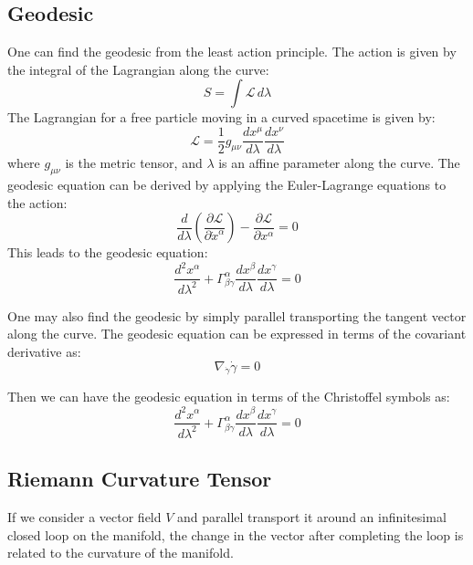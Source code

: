 \documentclass{article}
\begin{document}
\subsection{Geodesic}

One can find the geodesic from the least action principle. The action is given by the integral of the Lagrangian along the curve:
\begin{equation}
S = \int \mathcal{L} \, d\lambda
\end{equation}
The Lagrangian for a free particle moving in a curved spacetime is given by:
\begin{equation}
\mathcal{L} = \frac{1}{2} g_{\mu\nu} \frac{dx^\mu}{d\lambda} \frac{dx^\nu}{d\lambda}
\end{equation}
where $g_{\mu\nu}$ is the metric tensor, and $\lambda$ is an affine parameter along the curve. The geodesic equation can be derived by applying the Euler-Lagrange equations to the action:
\begin{equation}
\frac{d}{d\lambda} \left( \frac{\partial \mathcal{L}}{\partial \dot{x}^\alpha} \right) - \frac{\partial \mathcal{L}}{\partial x^\alpha} = 0
\end{equation}
This leads to the geodesic equation:
\begin{equation}
\frac{d^2 x^\alpha}{d\lambda^2} + \Gamma^\alpha_{\beta\gamma} \frac{dx^\beta}{d\lambda} \frac{dx^\gamma}{d\lambda} = 0
\end{equation}

One may also find the geodesic by simply parallel transporting the tangent vector along the curve. The geodesic equation can be expressed in terms of the covariant derivative as:
\begin{equation}
\nabla_{\dot{\gamma}} \dot{\gamma} = 0
\end{equation}

Then we can have the geodesic equation in terms of the Christoffel symbols as:
\begin{equation}
\frac{d^2 x^\alpha}{d\lambda^2} + \Gamma^\alpha_{\beta\gamma} \frac{dx^\beta}{d\lambda} \frac{dx^\gamma}{d\lambda} = 0
\end{equation}

\subsection{Riemann Curvature Tensor}

If we consider a vector field $V$ and parallel transport it around an infinitesimal closed loop on the manifold, the change in the vector after completing the loop is related to the curvature of the manifold.
\end{document}
